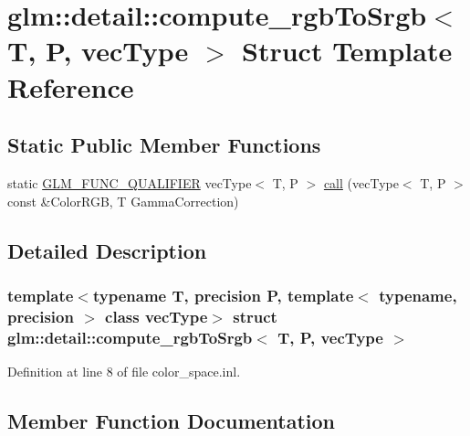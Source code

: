 \hypertarget{structglm_1_1detail_1_1compute__rgb_to_srgb}{}\section{glm\+::detail\+::compute\+\_\+rgb\+To\+Srgb$<$ T, P, vec\+Type $>$ Struct Template Reference}
\label{structglm_1_1detail_1_1compute__rgb_to_srgb}
\subsection*{Static Public Member Functions}
\begin{DoxyCompactItemize}
\item 
static \mbox{\hyperlink{setup_8hpp_a33fdea6f91c5f834105f7415e2a64407}{G\+L\+M\+\_\+\+F\+U\+N\+C\+\_\+\+Q\+U\+A\+L\+I\+F\+I\+ER}} vec\+Type$<$ T, P $>$ \mbox{\hyperlink{structglm_1_1detail_1_1compute__rgb_to_srgb_a641d15ac773c5b20ad9917ec0ea2974c}{call}} (vec\+Type$<$ T, P $>$ const \&Color\+R\+GB, T Gamma\+Correction)
\end{DoxyCompactItemize}


\subsection{Detailed Description}
\subsubsection*{template$<$typename T, precision P, template$<$ typename, precision $>$ class vec\+Type$>$\newline
struct glm\+::detail\+::compute\+\_\+rgb\+To\+Srgb$<$ T, P, vec\+Type $>$}



Definition at line 8 of file color\+\_\+space.\+inl.



\subsection{Member Function Documentation}
\mbox{\label{structglm_1_1detail_1_1compute__rgb_to_srgb_a641d15ac773c5b20ad9917ec0ea2974c}} 

